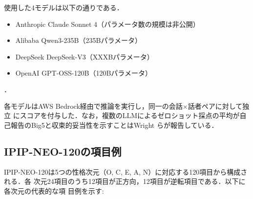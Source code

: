 \documentclass[dvipdfmx,11pt,a4paper]{bxjsarticle}
\renewcommand{\_}{\paperorigunderscore\allowbreak}%
\begin{document}
使用した4モデルは以下の通りである．


\begin{itemize}
  \item Anthropic Claude Sonnet 4（パラメータ数の規模は非公開）
  \item Alibaba Qwen3-235B（235Bパラメータ）
  \item DeepSeek DeepSeek-V3（XXXBパラメータ）
  \item OpenAI GPT-OSS-120B（120Bパラメータ）
  \end{itemize}


\cite{wright2026}．

各モデルはAWS Bedrock経由で推論を実行し，同一の会話$\times$話者ペアに対して独立
にスコアを付与した．なお，複数のLLMによるゼロショット採点の平均が自
己報告のBig5と収束的妥当性を示すことはWright ら\cite{wright2026}が報告している．


\subsection{IPIP-NEO-120の項目例}
\label{sec:appendix_ipip}

IPIP-NEO-120は5つの性格次元（O, C, E, A, N）に対応する120項目から構成される．各
次元24項目のうち12項目が正方向，12項目が逆転項目である．以下に各次元の代表的な項
目例を示す:
\end{document}
